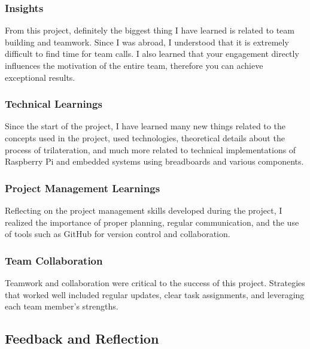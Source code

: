 \documentclass[12pt,a4paper]{article}
\begin{document}
\subsubsection{Insights}
From this project, definitely the biggest thing I have learned is related to team building and teamwork. Since I was abroad, I understood that it is extremely difficult to find time for team calls. I also learned that your engagement directly influences the motivation of the entire team, therefore you can achieve exceptional results.

\subsubsection{Technical Learnings}
Since the start of the project, I have learned many new things related to the concepts used in the project, used technologies, theoretical details about the process of trilateration, and much more related to technical implementations of Raspberry Pi and embedded systems using breadboards and various components.

\subsubsection{Project Management Learnings}
Reflecting on the project management skills developed during the project, I realized the importance of proper planning, regular communication, and the use of tools such as GitHub for version control and collaboration.

\subsubsection{Team Collaboration}
Teamwork and collaboration were critical to the success of this project. Strategies that worked well included regular updates, clear task assignments, and leveraging each team member's strengths.

\subsection{Feedback and Reflection}
\end{document}
